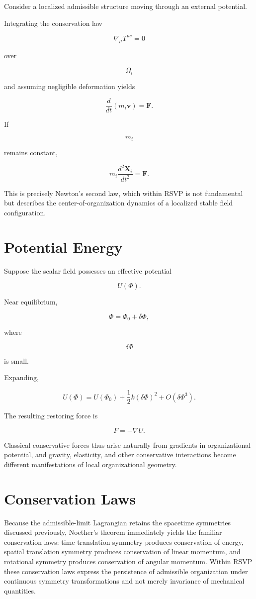\documentclass[11pt,oneside]{book}
\numberwithin{equation}{chapter}
\theoremstyle{definition}
\theoremstyle{plain}
\begin{document}
Consider a localized admissible structure moving through an external
potential.

Integrating the conservation law

\[
\nabla_\mu
T^{\mu\nu}
=
0
\]

over

\[
\Omega_i
\]

and assuming negligible deformation yields

\[
\frac{d}{dt}
(m_i\mathbf v)
=
\mathbf F.
\]

If

\[
m_i
\]

remains constant,

\[
\boxed{
m_i
\frac{d^2\mathbf X_i}{dt^2}
=
\mathbf F.
}
\]

This is precisely Newton's second law, which within RSVP is not fundamental but describes the center-of-organization dynamics of a localized stable field configuration.

\section{Potential Energy}

Suppose the scalar field possesses an effective potential

\[
U(\Phi).
\]

Near equilibrium,

\[
\Phi
=
\Phi_0+\delta\Phi,
\]

where

\[
\delta\Phi
\]

is small.

Expanding,

\[
U(\Phi)
=
U(\Phi_0)
+
\frac12
k
(\delta\Phi)^2
+
O(\delta\Phi^3).
\]

The resulting restoring force is

\[
F
=
-
\nabla U.
\]

Classical conservative forces thus arise naturally from gradients in organizational potential, and gravity, elasticity, and other conservative interactions become different manifestations of local organizational geometry.

\section{Conservation Laws}

Because the admissible-limit Lagrangian retains the spacetime symmetries discussed previously, Noether's theorem immediately yields the familiar conservation laws: time translation symmetry produces conservation of energy, spatial translation symmetry produces conservation of linear momentum, and rotational symmetry produces conservation of angular momentum. Within RSVP these conservation laws express the persistence of admissible organization under continuous symmetry transformations and not merely invariance of mechanical quantities.
\end{document}
